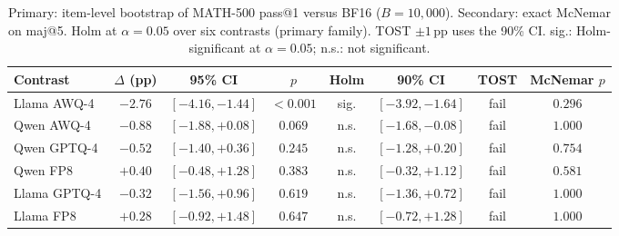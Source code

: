 \documentclass[11pt,a4paper]{article}
\begin{document}
\begin{table}[t]
\centering
\caption{Primary: item-level bootstrap of MATH-500 pass@1 versus BF16 ($B=10{,}000$). Secondary: exact McNemar on maj@5. Holm at $\alpha=0.05$ over six contrasts (primary family). TOST $\pm 1$\,pp uses the 90\% CI. sig.: Holm-significant at $\alpha=0.05$; n.s.: not significant.}
\label{tab:pass1}
\small
\setlength{\tabcolsep}{4.75pt}
\begin{tabular}{lccccccc}
\toprule
\textbf{Contrast} & $\Delta$ (pp) & \textbf{95\% CI} & $p$ & \textbf{Holm} & \textbf{90\% CI} & \textbf{TOST} & \textbf{McNemar $p$} \\
\midrule
Llama AWQ-4  & $-2.76$ & $[-4.16,-1.44]$ & $<0.001$ & sig. & $[-3.92,-1.64]$ & fail & $0.296$ \\
Qwen AWQ-4   & $-0.88$ & $[-1.88,+0.08]$ & $0.069$ & n.s. & $[-1.68,-0.08]$ & fail & $1.000$ \\
Qwen GPTQ-4  & $-0.52$ & $[-1.40,+0.36]$ & $0.245$ & n.s. & $[-1.28,+0.20]$ & fail & $0.754$ \\
Qwen FP8     & $+0.40$ & $[-0.48,+1.28]$ & $0.383$ & n.s. & $[-0.32,+1.12]$ & fail & $0.581$ \\
Llama GPTQ-4 & $-0.32$ & $[-1.56,+0.96]$ & $0.619$ & n.s. & $[-1.36,+0.72]$ & fail & $1.000$ \\
Llama FP8    & $+0.28$ & $[-0.92,+1.48]$ & $0.647$ & n.s. & $[-0.72,+1.28]$ & fail & $1.000$ \\
\bottomrule
\end{tabular}
\end{table}
\end{document}
